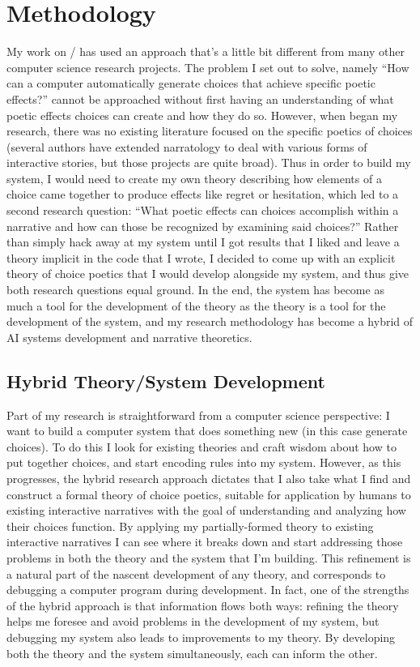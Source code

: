 \chapter{Methodology}

\label{ch:method}

My work on \dunyazad/ has used an approach that's a little bit different from many other computer science research projects.
%
The problem I set out to solve, namely ``How can a computer automatically generate choices that achieve specific poetic effects?'' cannot be approached without first having an understanding of what poetic effects choices can create and how they do so.
%
However, when began my research, there was no existing literature focused on the specific poetics of choices (several authors have extended narratology to deal with various forms of interactive stories, but those projects are quite broad).
%
Thus in order to build my system, I would need to create my own theory describing how elements of a choice came together to produce effects like regret or hesitation, which led to a second research question: ``What poetic effects can choices accomplish within a narrative and how can those be recognized by examining said choices?''
%
Rather than simply hack away at  my system until I got results that I liked and leave a theory implicit in the code that I wrote, I decided to come up with an explicit theory of choice poetics that I would develop alongside my system, and thus give both research questions equal ground.
%
In the end, the system has become as much a tool for the development of the theory as the theory is a tool for the development of the system, and my research methodology has become a hybrid of AI systems development and narrative theoretics.


\section{Hybrid Theory/System Development}

Part of my research is straightforward from a computer science perspective: I want to build a computer system that does something new (in this case generate choices).
%
To do this I look for existing theories and craft wisdom about how to put together choices, and start encoding rules into my system.
%
However, as this progresses, the hybrid research approach dictates that I also take what I find and construct a formal theory of choice poetics, suitable for application by humans to existing interactive narratives with the goal of understanding and analyzing how their choices function.
%
By applying my partially-formed theory to existing interactive narratives I can see where it breaks down and start addressing those problems in both the theory and the system that I'm building.
%
This refinement is a natural part of the nascent development of any theory, and corresponds to debugging a computer program during development.
%
In fact, one of the strengths of the hybrid approach is that information flows both ways: refining the theory helps me foresee and avoid problems in the development of my system, but debugging my system also leads to improvements to my theory.
%
By developing both the theory and the system simultaneously, each can inform the other.


